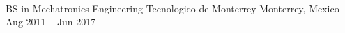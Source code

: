 \documentclass[]{awesome-cv}
\begin{document}
\begin{center}
	  \\
	\vspace{2mm}
	{}
\end{center}

\vspace{-2mm}
\begin{cventries}
	\cventry
	{BS in Mechatronics Engineering}
	{Tecnologico de Monterrey}
	{Monterrey, Mexico}
	{Aug 2011 – Jun 2017}
	{}
\end{cventries}
\end{document}

